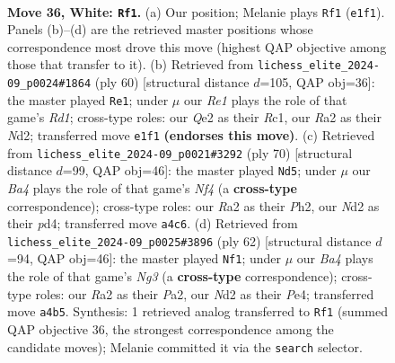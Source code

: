\documentclass[11pt]{article}
\begin{document}
\clearpage

\begin{figure}[p]\centering
\begin{subfigure}{0.46\textwidth}\centering
\resizebox{\linewidth}{!}{%
\newchessgame
\chessboard[
  setfen={r1b2r2/ppn2p1k/5Bp1/q2p4/B5pP/NP6/R1PNQP2/4R1K1 w - - 2 36},
  showmover=false,
  pgfstyle=straightmove, color=movearrow, markmove={e1-f1}
]}
\caption{}
\end{subfigure}\hfill
\begin{subfigure}{0.46\textwidth}\centering
\resizebox{\linewidth}{!}{%
\newchessgame
\chessboard[
  setfen={1brr4/5qpk/p2n3p/1pB2p2/1P6/P4Q1P/3N1PP1/2RR1K2 w - - 4 31},
  showmover=false,
  pgfstyle=straightmove, color=movearrow, markmove={d1-e1}
]}
\caption{}
\end{subfigure}
\\[4pt]
\begin{subfigure}{0.46\textwidth}\centering
\resizebox{\linewidth}{!}{%
\newchessgame
\chessboard[
  setfen={6k1/4r2p/1pBn2p1/2b1qp2/Pp1p1N2/1P1Q1P2/6PP/3R3K w - - 2 36},
  showmover=false,
  pgfstyle=straightmove, color=movearrow, markmove={f4-d5}
]}
\caption{}
\end{subfigure}\hfill
\begin{subfigure}{0.46\textwidth}\centering
\resizebox{\linewidth}{!}{%
\newchessgame
\chessboard[
  setfen={5rk1/r4p2/3p2p1/p2Bp3/4Pqnp/2P3N1/PP4Q1/4R1K1 w - - 0 32},
  showmover=false,
  pgfstyle=straightmove, color=movearrow, markmove={g3-f1}
]}
\caption{}
\end{subfigure}
\caption{\textbf{Move 36, White: \texttt{Rf1}.} (a) Our position; Melanie plays \texttt{Rf1} (\texttt{e1f1}). Panels (b)--(d) are the retrieved master positions whose correspondence most drove this move (highest QAP objective among those that transfer to it). (b) Retrieved from \texttt{lichess\_elite\_2024-09\_p0024\#1864} (ply 60) [structural distance $d$=105, QAP obj=36]: the master played \texttt{Re1}; under $\mu$ our \emph{Re1} plays the role of that game's \emph{Rd1}; cross-type roles: our \emph{Q}e2 as their \emph{R}c1, our \emph{R}a2 as their \emph{N}d2; transferred move \texttt{e1f1} \textbf{(endorses this move)}. (c) Retrieved from \texttt{lichess\_elite\_2024-09\_p0021\#3292} (ply 70) [structural distance $d$=99, QAP obj=46]: the master played \texttt{Nd5}; under $\mu$ our \emph{Ba4} plays the role of that game's \emph{Nf4} (a \textbf{cross-type} correspondence); cross-type roles: our \emph{R}a2 as their \emph{P}h2, our \emph{N}d2 as their \emph{p}d4; transferred move \texttt{a4c6}. (d) Retrieved from \texttt{lichess\_elite\_2024-09\_p0025\#3896} (ply 62) [structural distance $d$=94, QAP obj=46]: the master played \texttt{Nf1}; under $\mu$ our \emph{Ba4} plays the role of that game's \emph{Ng3} (a \textbf{cross-type} correspondence); cross-type roles: our \emph{R}a2 as their \emph{P}a2, our \emph{N}d2 as their \emph{P}e4; transferred move \texttt{a4b5}. Synthesis: 1 retrieved analog transferred to \texttt{Rf1} (summed QAP objective 36, the strongest correspondence among the candidate moves); Melanie committed it via the \texttt{search} selector.}
\label{fig:thought-m70}
\end{figure}
\end{document}
